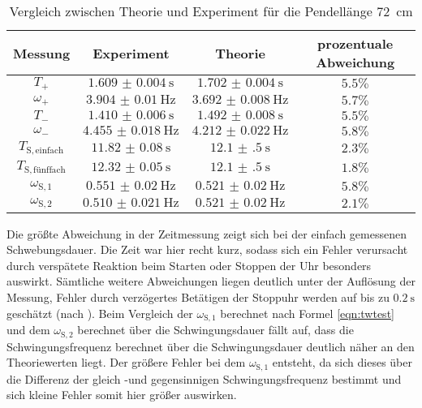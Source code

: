 \begin{table}
	\caption{Vergleich zwischen Theorie und Experiment für die Pendellänge 72 \,\si{\centi\meter}}
	\label{tab:discuss2}
	\begin{tabular}{cccc}
		\toprule
		Messung                    & Experiment               & Theorie                  & prozentuale Abweichung \\
		\midrule
		$T_{\mathrm{+}}$           & $\SI{1.609(4)}{\second}$ & $\SI{1.702(4)}{\second}$ & $5.5\%$                \\
		$\omega_{\mathrm{+}}$      & $\SI{3.904(10)}{\Hz}$    & $\SI{3.692(8)}{\Hz}$     & $5.7\%$                \\
		$T_{\mathrm{-}}$           & $\SI{1.410(6)}{\second}$ & $\SI{1.492(8)}{\second}$ & $5.5\% $               \\
		$\omega_{\mathrm{-}}$      & $\SI{4.455(18)}{\hertz}$ & $\SI{4.212(22)}{\Hz}$    & $5.8\%$                \\
		$T_{\mathrm{S,einfach}}$   & $\SI{11.82(8)}{\second}$ & $\SI{12.1(5)}{\second}$  & $2.3\%$                \\
		$T_{\mathrm{S,fünffach}}$ & $\SI{12.32(5)}{\second}$ & $\SI{12.1(5)}{\second}$  & $1.8\%$                \\
		$\omega_{\mathrm{S,1}}$    & $\SI{0.551(20)}{\Hz}$    & $\SI{0.521(20)}{\Hz}$    & $5.8\%$                \\
		$\omega_{\mathrm{S,2}}$    & $\SI{0.510(21)}{\Hz}$    & $\SI{0.521(20)}{\Hz}$    & $2.1\%$                \\

		\bottomrule
	\end{tabular}
\end{table}

Die größte Abweichung in der Zeitmessung zeigt sich bei der einfach gemessenen Schwebungsdauer. Die Zeit war hier recht kurz, sodass sich ein Fehler verursacht durch verspätete Reaktion beim Starten oder Stoppen der Uhr besonders auswirkt.
Sämtliche weitere Abweichungen liegen deutlich unter der Auflösung der Messung, Fehler durch verzögertes Betätigen der Stoppuhr werden auf bis zu $\SI{0.2}{\second}$ geschätzt (nach \cite{CS-Pro}).
Beim Vergleich der $\omega_{\mathrm{S,1}}$ berechnet nach Formel \eqref{eqn:twtest} und dem $\omega_{\mathrm{S,2}}$ berechnet über die Schwingungsdauer fällt auf, dass die Schwingungsfrequenz berechnet über die Schwingungsdauer deutlich näher an den Theoriewerten liegt.
Der größere Fehler bei dem  $\omega_{\mathrm{S,1}}$ entsteht, da sich dieses über die Differenz der gleich -und gegensinnigen Schwingungsfrequenz bestimmt und sich kleine Fehler somit hier größer auswirken.
